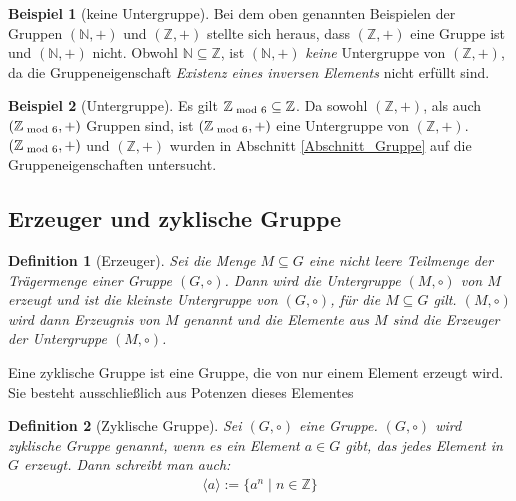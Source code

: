 \documentclass[12pt,a4paper, usenames, dvipsnames]{article}
\theoremstyle{mystyle}
\newtheorem{definition}{Definition}
\theoremstyle{definition}
\newtheorem{bsp}{Beispiel}[definition]
\begin{document}
\begin{bsp}[keine Untergruppe]

Bei dem oben genannten Beispielen der Gruppen $(\mathbb{N},+)$ und $(\mathbb{Z},+)$ stellte sich heraus, dass $(\mathbb{Z},+)$ eine Gruppe ist und $(\mathbb{N},+)$ nicht. Obwohl $\mathbb{N \subseteq \mathbb{Z}}$, ist $(\mathbb{N},+)$ \textit{keine} Untergruppe von $(\mathbb{Z},+)$, da die Gruppeneigenschaft \textit{Existenz eines inversen Elements} nicht erfüllt sind.

\end{bsp}
\begin{bsp}[Untergruppe]

Es gilt $\mathbb{Z}_{\hspace*{-0.3em}\mod 6} \subseteq \mathbb{Z}$. Da sowohl $(\mathbb{Z},+)$, als auch $(\mathbb{Z}_{\hspace*{-0.3em}\mod 6}, +)$ Gruppen sind, ist $(\mathbb{Z}_{\hspace*{-0.3em}\mod 6}, +)$ eine Untergruppe von $(\mathbb{Z},+)$. $(\mathbb{Z}_{\hspace*{-0.3em}\mod 6}, +)$ und $(\mathbb{Z},+)$ wurden in Abschnitt \ref{Abschnitt_Gruppe} auf die Gruppeneigenschaften untersucht.

\end{bsp}

%
%
%
%
%
%
%
%
%
%

\subsection{Erzeuger und zyklische Gruppe} 
\label{Abschnitt_Erzeuger}


\begin{definition}[Erzeuger]
Sei die Menge $M \subseteq G$ eine nicht leere Teilmenge der Trägermenge einer Gruppe $(G, \circ)$. 
Dann wird die Untergruppe $(M, \circ)$ von $M$ erzeugt und ist die kleinste Untergruppe von $(G, \circ)$, für die $M \subseteq G$ gilt.
$(M, \circ)$ wird dann Erzeugnis von $M$ genannt und die Elemente aus $M$ sind die Erzeuger der Untergruppe $(M, \circ)$.
\end{definition}

Eine zyklische Gruppe ist eine Gruppe, die von nur einem Element erzeugt wird. Sie besteht ausschließlich aus Potenzen dieses Elementes

\begin{definition}[Zyklische Gruppe]
Sei $(G, \circ)$ eine Gruppe. $(G, \circ)$ wird zyklische Gruppe genannt, wenn es ein Element $a \in G$ gibt, das jedes Element in $G$ erzeugt. Dann schreibt man auch:
\begin{align*}
\langle a \rangle := \{ a^n \mid n \in \mathbb{Z} \}
\end{align*}

\end{definition}
\end{document}

